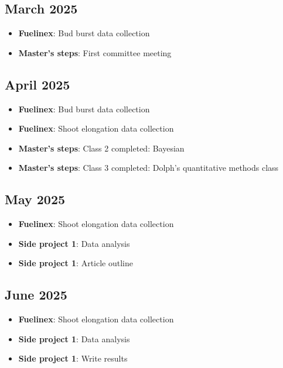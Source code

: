 \documentclass{article}
\begin{document}
\subsection*{March 2025}
\begin{itemize}
    \item \textbf{Fuelinex}: Bud burst data collection
    \item \textbf{Master's steps}: First committee meeting
\end{itemize}

\subsection*{April 2025}
\begin{itemize}
    \item \textbf{Fuelinex}: Bud burst data collection
    \item \textbf{Fuelinex}: Shoot elongation data collection
    \item \textbf{Master's steps}: Class 2 completed: Bayesian
    \item \textbf{Master's steps}: Class 3 completed: Dolph's quantitative methods class
\end{itemize}

\subsection*{May 2025}
\begin{itemize}
    \item \textbf{Fuelinex}: Shoot elongation data collection
    \item \textbf{Side project 1}: Data analysis
    \item \textbf{Side project 1}: Article outline
\end{itemize}

\subsection*{June 2025}
\begin{itemize}
    \item \textbf{Fuelinex}: Shoot elongation data collection
    \item \textbf{Side project 1}: Data analysis
    \item \textbf{Side project 1}: Write results
\end{itemize}
\end{document}
